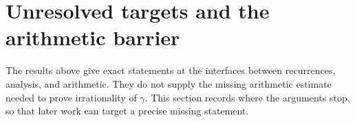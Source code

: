 \documentclass[11pt,a4paper]{article}
\theoremstyle{definition}
\theoremstyle{remark}
\numberwithin{equation}{section}
\begin{document}


\section{Unresolved targets and the arithmetic barrier}
\label{p3:sec:unresolved}

The results above give exact statements at the interfaces between
recurrences, analysis, and arithmetic. They do not supply the missing
arithmetic estimate needed to prove irrationality of $\gamma$.
This section records where the arguments stop, so that later work can
target a precise missing statement.
\end{document}

